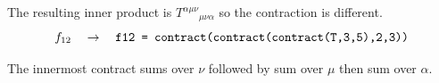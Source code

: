 \documentclass[12pt]{article}
\begin{document}
\noindent
The resulting inner product is $T^{\alpha\mu\nu}{}_{\mu\nu\alpha}$
so the contraction is different.
\begin{equation*}
f_{12}
\quad\rightarrow\quad
\text{\tt f12 = contract(contract(contract(T,3,5),2,3))}
\end{equation*}

\noindent
The innermost contract sums over $\nu$ followed by sum over $\mu$ then sum over $\alpha$.
\end{document}
